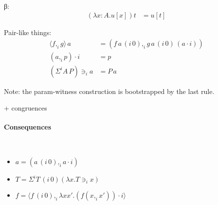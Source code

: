 \documentclass[english]{PaperTools/latex/lipics}
\newcommand\CP[3]{(#2,_{#1} #3)}
\newcommand\CSig[1]{\Sigma^{#1}}
\newcommand\param[1]{\!\cdot\!#1}
\newcommand\op[1]{∋_{#1}}
\newcommand\ip[3]{Σ^{#1} {#2}\,{#3}}
\newcommand\fp[3]{⟨#2 ,_{#1} #3⟩}
\newcommand\mor[2]{{#1}\,{#2}}
\newcommand\proj[2]{\mor{#2}{(#1\,0)}}
\newcommand\comment[1]{}
\begin{document}
\comment{
\begin{definition}[Normal forms and neutral terms]~
  \begin{align*}
    \mathsf{Nf} ∋ u,v,A,B & \coloneqq
      U \mid λx:A. t \mid (x:A) → B \\
      & \mid \CP i u v \mid \fp i u v \\
      & \mid {(\ip {i₀} A B)} \op {i₁} {u_1 \cdots} \op {i_n} {u_n} &\quad \text{($i₀ \prec i₁ \prec \ldots \prec i_n$)} \\
      & \mid s \param {i₀} \cdots \param {i_{n-1}}                  &\quad \text{($i₀ \prec   < \ldots \prec i_{n-1}$)}
    \\
    \mathsf{Ne} ∋ s & \coloneqq x \mid s \, u
  \end{align*}
\end{definition}
}
\begin{definition}[Conversion]~

β:
\begin{align*}
  (λx:A. u[x]) t &= u[t]
\end{align*}

Pair-like things:
\begin{align*}
  {\fp i f g} \, a      &= (f\,{\proj i a} ,_i g\,{\proj i a}\,{(a \param i)}) \\
  {(a,_i p)} \param i   &= p \\
  {(\ip i A P)} \op i a &= P\,a
\end{align*}

Note: the param-witness construction is bootstrapped by the last rule.

  + congruences
\end{definition}

\paragraph{Consequences}
\begin{corollary}~
  \begin{itemize}
  \item $a = \CP i {\proj i a} {a \param i}$
  \item $T = \CSig i {\proj i T} {(λx. T \op i x)}$
  \item $f = \fp i {\proj i f} {λx x'. (f \CP i x {x'}) \param i}$
  \end{itemize}
\end{corollary}
\end{document}
